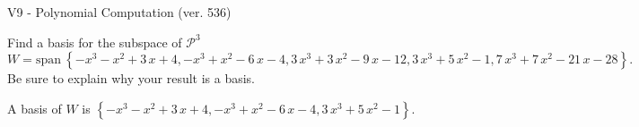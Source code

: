 \begin{exercise}
  \begin{exerciseTitle}V9 - Polynomial Computation (ver. 536)\end{exerciseTitle}
  \begin{exerciseStatement}
    Find a basis for the subspace of \(\mathcal{P}^3\) 
\[W=\mathrm{span}\ \left\{-x^{3} - x^{2} + 3 \, x + 4 , -x^{3} + x^{2} - 6 \, x - 4 , 3 \, x^{3} + 3 \, x^{2} - 9 \, x - 12 , 3 \, x^{3} + 5 \, x^{2} - 1 , 7 \, x^{3} + 7 \, x^{2} - 21 \, x - 28\right\}.\]
 Be sure to explain why your result is a basis.


  \end{exerciseStatement}
  \begin{exerciseAnswer}
   A basis of \(W\) is  \(\left\{-x^{3} - x^{2} + 3 \, x + 4 , -x^{3} + x^{2} - 6 \, x - 4 , 3 \, x^{3} + 5 \, x^{2} - 1\right\}\).
  


  \end{exerciseAnswer}
\end{exercise}